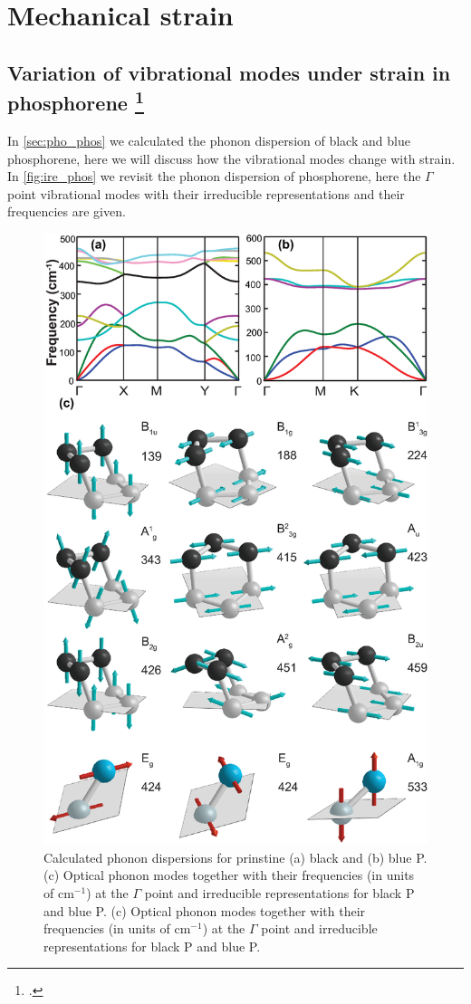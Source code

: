 \section{Mechanical strain}
\subsection[Variation of vibrational modes under strain in phosphorene]{Variation of vibrational modes under strain in phosphorene \footcite[This work is published in:][]{Aierken2015.thermalP}}

In \autoref{sec:pho_phos} we calculated the phonon dispersion of black and blue phosphorene, here we will discuss how the vibrational modes change with strain. In \autoref{fig:ire_phos} we revisit the phonon dispersion of phosphorene, here the $\Gamma$ point vibrational modes with their irreducible representations and their frequencies are given.

\begin{figure}[htbp]
\centering
\includegraphics[width=0.8\linewidth]{phos_phon.eps}%
\caption{Calculated phonon dispersions for prinstine (a) black and (b) blue P. (c) Optical phonon modes together with their frequencies (in units of cm$^{-1}$) at the $\Gamma$ point and irreducible representations for black P and blue P. (c) Optical phonon modes together with their frequencies (in units of cm$^{-1}$) at the $\Gamma$ point and irreducible representations for black P and blue P.\label{fig:ire_phos}}
\end{figure}

